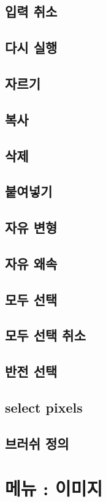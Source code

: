 \documentclass[12pt, a4paper, oneside]{book}
\let\stdsection\section
\renewcommand\section{\newpage\stdsection}
\begin{document}
\section{	입력 취소		}									
\section{	다시 실행		}									
\section{	자르기		}									
\section{	복사		}									
\section{	삭제		}									
\section{	붙여넣기		}									
\section{	자유 변형		}									
\section{	자유 왜속		}									
\section{	모두 선택		}									
\section{	모두 선택 취소		}									
\section{	반전 선택		}									
\section{	select pixels		}									
\section{	브러쉬 정의		}									


	\chapter{메뉴 : 이미지} 
	\minitoc
\end{document}
